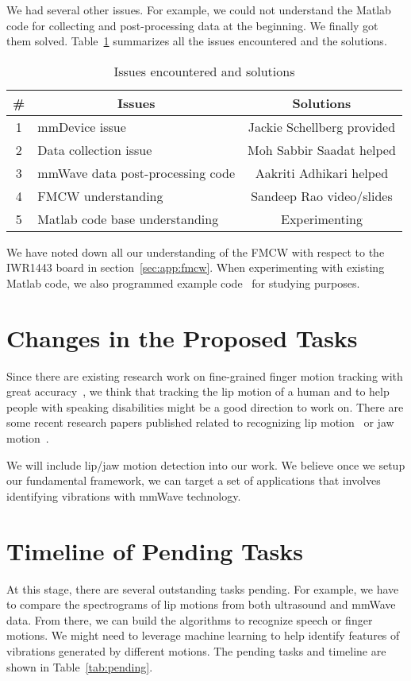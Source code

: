 \documentclass[11pt, oneside]{article}   	%
\begin{document}
We had several other issues. For example, we could not understand the Matlab code for collecting and post-processing data at the beginning. We finally got them solved. Table~\ref{tab:issues} summarizes all the issues encountered and the solutions.


\begin{table}[ht]
\centering 
\caption{Issues encountered and solutions}
\label{tab:issues}
\vspace{4pt}
\begin{tabular}{|c|l|c|}
\hline
\# &  \multicolumn{1}{|c|}{Issues} & Solutions  \\
\hline
\hline
1 & mmDevice issue & Jackie Schellberg provided\\
\hline
2 & Data collection issue & Moh Sabbir Saadat helped \\
\hline
3 & mmWave data post-processing code & Aakriti Adhikari  helped\\
\hline
4 & FMCW understanding & Sandeep Rao video/slides \\
\hline
5 & Matlab code base understanding & Experimenting  \\
\hline
\end{tabular}
\end{table}

We have noted down all our understanding of the FMCW with respect to the IWR1443 board in section~\ref{sec:app:fmcw}. When experimenting with existing Matlab code, we also programmed example code~\cite{ref:code} for studying purposes.



\section{Changes in the Proposed Tasks}
Since there are existing research work on fine-grained finger motion tracking with great accuracy~\cite{ref:mm4arm23}, we think that tracking the lip motion of a human and to help people with speaking disabilities might be a good direction to work on. There are some recent research papers published related to recognizing lip motion~\cite{ref:mmmic23} or jaw motion~\cite{ref:muteit22}. 

We will include lip/jaw motion detection into our work. We believe once we setup our fundamental framework, we can target a set of applications that involves identifying vibrations with mmWave technology.

\section{Timeline of Pending Tasks}
At this stage, there are several outstanding tasks pending. For example, we have to compare the spectrograms of lip motions from both ultrasound and mmWave data. From there, we can build the algorithms to recognize speech or finger motions. We might need to leverage machine learning to help identify features of vibrations generated by different motions. The pending tasks and timeline are shown in Table~\ref{tab:pending}.
\end{document}

